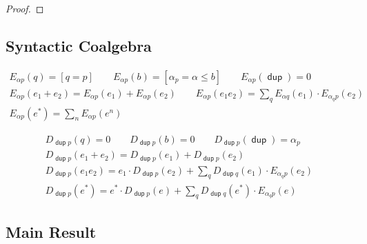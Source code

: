 \documentclass{article}
\renewcommand\smash{\mathrel{\diamond}}
\newcommand\ssum{\mathop{\textstyle\sum}}
\newcommand\sbigcup{\mathop{\textstyle\bigcup}}
\newcommand\pdup{\mathop{\mathsf{dup}}}
\newcommand\bval[1]{[#1]}
\renewcommand\star{^{\textstyle *}}
\begin{document}
\begin{proof}
%
\end{proof}

\subsection*{Syntactic Coalgebra}

\begin{gather*}
E_{\alpha p}(q) = \bval{q = p} \qquad
E_{\alpha p}(b) = \bval{\alpha_p=\alpha\leq b} \qquad
E_{\alpha p}(\pdup) = 0\\
E_{\alpha p}(e_1+e_2) = E_{\alpha p}(e_1)+E_{\alpha p}(e_2) \qquad
E_{\alpha p}(e_1e_2) = \ssum_{q} E_{\alpha q}(e_1)\cdot E_{\alpha_q p}(e_2)\\
E_{\alpha p}(e\star) = \ssum_n E_{\alpha p}(e^n)
\end{gather*}

\begin{gather*}
D_{\pdup p}(q) = 0 \qquad
D_{\pdup p}(b) = 0 \qquad
D_{\pdup p}(\pdup) = \alpha_p\\
D_{\pdup p}(e_1+e_2) = D_{\pdup p}(e_1)+D_{\pdup p}(e_2)\\
D_{\pdup p}(e_1e_2) = e_1\cdot D_{\pdup p}(e_2) + \ssum_{q} D_{\pdup q}(e_1)\cdot E_{\alpha_qp}(e_2)\\
D_{\pdup p}(e\star) = e\star\cdot D_{\pdup p}(e) + \ssum_{q} D_{\pdup q}(e\star)\cdot E_{\alpha_qp}(e)
\end{gather*}

\subsection*{Main Result}
\end{document}
